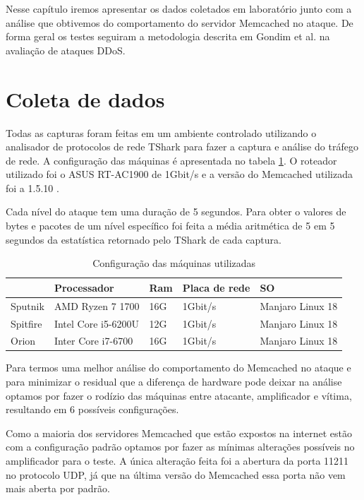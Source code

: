 \label{cap:Apresetacao}

Nesse capítulo iremos apresentar os dados coletados em laboratório junto com a análise que obtivemos do comportamento do servidor Memcached no ataque. De forma geral os testes seguiram a metodologia descrita em Gondim et al. \cite{Gondim2016} na avaliação de ataques DDoS.

\section{Coleta de dados}
\label{sec:Coleta}
Todas as capturas foram feitas em um ambiente controlado utilizando o analisador de protocolos de rede TShark para fazer a captura e análise do tráfego de rede. A configuração das máquinas é apresentada no tabela \ref{tab:ConfMaq}. O roteador utilizado foi o ASUS RT-AC1900 de 1Gbit/s e a versão do Memcached utilizada foi a 1.5.10 .

Cada nível do ataque tem uma duração de 5 segundos. Para obter o valores de bytes e pacotes de um nível específico foi feita a média aritmética de 5 em 5 segundos da estatística retornado pelo TShark de cada captura.
 
\begin{table}[H]
\label{tab:ConfMaq}
\caption{Configuração das máquinas utilizadas}
\begin{tabular}{|l|l|l|l|l|}
\hline
         & Processador         & Ram & Placa de rede           & SO               \\ \hline
Sputnik  & AMD Ryzen 7 1700    & 16G & 1Gbit/s & Manjaro Linux 18 \\ \hline
Spitfire & Intel Core i5-6200U & 12G & 1Gbit/s & Manjaro Linux 18 \\ \hline
Orion    & Inter Core i7-6700  & 16G & 1Gbit/s & Manjaro Linux 18 \\ \hline
\end{tabular}
\end{table}

Para termos uma melhor análise do comportamento do Memcached no ataque e para minimizar o residual que a diferença de hardware pode deixar na análise optamos por fazer o rodízio das máquinas entre atacante, amplificador e vítima, resultando em 6 possíveis configurações.

Como a maioria dos servidores Memcached que estão expostos na internet estão com a configuração padrão optamos por fazer as mínimas alterações possíveis no amplificador para o teste. A única alteração feita foi a abertura da porta 11211 no protocolo UDP, já que na última versão do Memcached essa porta não vem mais aberta por padrão.

